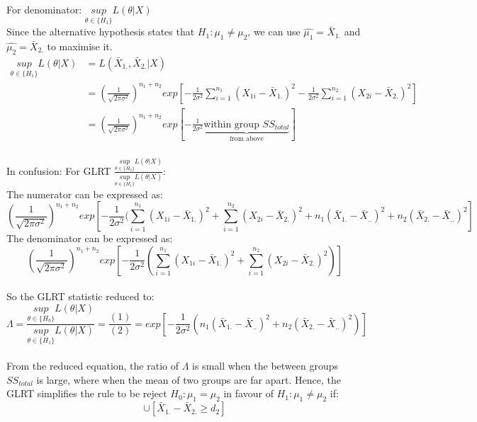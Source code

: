 \documentclass[12pt ]{article}
\begin{document}
For denominator: $\underset{\theta \in \{H_{1}\}}{sup} L(\theta | X)$ \\
Since the alternative hypothesis states that $H_{1}: \mu_{1} \neq \mu_{2}$, we can use $\hat{\mu_{1}} = \bar{X}_{1.}$ and $\hat{\mu_{2}} = \bar{X}_{2.}$ to maximise it. \\
\begin{align*}
\underset{\theta \in \{H_{1}\}}{sup} L(\theta | X) &= L(\bar{X}_{1.}, \bar{X}_{2.} |X) \\
&= (\frac{1}{\sqrt{2 \pi \sigma^2}})^{n_{1}+n_{2}} exp[-\frac{1}{2\sigma^2} \sum_{i=1}^{n_{1}} (X_{1i} - \bar{X}_{1.})^2 -\frac{1}{2\sigma^2} \sum_{i=1}^{n_{2}} (X_{2i} - \bar{X}_{2.})^2] \\
&= (\frac{1}{\sqrt{2 \pi \sigma^2}})^{n_{1}+n_{2}} exp[-\frac{1}{2\sigma^2} \underbrace{\text{within group $SS_{total}$}}_{\text{from above}}]
\end{align*} \\

In confusion:
For GLRT $\frac{\underset{\theta \in \{H_{0}\}}{sup} L(\theta | X)}{\underset{\theta \in \{H_{1}\}}{sup} L(\theta | X)}$: \\
The numerator can be expressed as:
\begin{equation}
(\frac{1}{\sqrt{2 \pi \sigma^2}})^{n_{1}+n_{2}} exp[-\frac{1}{2\sigma^2} (\sum_{i=1}^{n_{1}} (X_{1i} - \bar{X}_{1.})^2 + \sum_{i=1}^{n_{2}} (X_{2i} - \bar{X}_{2.})^2 + n_{1}(\bar{X}_{1.} - \bar{X}_{..})^2 + n_{2}(\bar{X}_{2.} - \bar{X}_{..})^2]
\end{equation}
The denominator can be expressed as:
\begin{equation}
(\frac{1}{\sqrt{2 \pi \sigma^2}})^{n_{1}+n_{2}} exp[-\frac{1}{2\sigma^2} (\sum_{i=1}^{n_{1}} (X_{1i} - \bar{X}_{1.})^2 + \sum_{i=1}^{n_{2}} (X_{2i} - \bar{X}_{2.})^2)]
\end{equation} \\

So the GLRT statistic reduced to:
\begin{equation*}
\Lambda = \frac{\underset{\theta \in \{H_{0}\}}{sup} L(\theta | X)}{\underset{\theta \in \{H_{1}\}}{sup} L(\theta | X)} = \frac{(1)}{(2)} = exp[-\frac{1}{2\sigma^2} (n_{1}(\bar{X}_{1.} - \bar{X}_{..})^2 + n_{2}(\bar{X}_{2.} - \bar{X}_{..})^2)]
\end{equation*}\\

From the reduced equation, the ratio of $\Lambda$ is small when the between groups $SS_{total}$ is large, where when the mean of two groups are far apart. Hence, the GLRT simplifies the rule to be reject $H_{0}: \mu_{1} = \mu_{2}$ in favour of $H_{1}: \mu_{1} \neq \mu_{2}$ if:
\begin{equation*}
[\bar{X}_{1.} - \bar{X}_{2.} \leq d_{1}] \cup [\bar{X}_{1.} - \bar{X}_{2.} \geq d_{2}]
\end{equation*}
\end{document}
